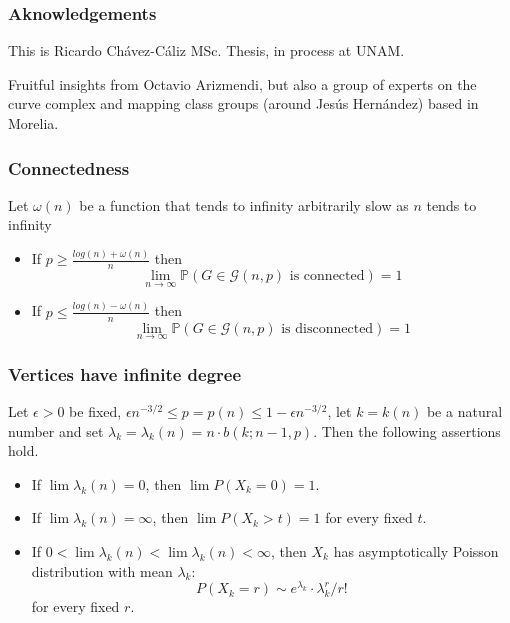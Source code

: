 \documentclass[handout]{beamer}
\theoremstyle{plain}
\renewcommand{\P}{\mathbb{P}}
\newcommand{\G}{\mathcal{G}}
\begin{document}
\begin{frame}\frametitle{Aknowledgements}

\begin{center}
This  is  Ricardo Ch\'avez-C\'aliz  MSc. Thesis, in process at  UNAM. 
\end{center}

Fruitful  insights  from  Octavio Arizmendi, \pause but  also a  group  of  experts on the  curve  complex  and  mapping class  groups (around Jes\'us Hern\'andez) based  in Morelia.

\end{frame}

\begin{frame}
\frametitle{Connectedness}

\begin{theorem}
Let $\omega(n)$ be a function that tends to infinity arbitrarily slow as $n$ tends to infinity
\begin{itemize}
\item If $p\geq \frac{log(n)+ \omega(n)}{n}$ then 
$$\lim_{n \to \infty} \P(G \in \G(n,p) \text{ is connected}) = 1$$
\item If $p\leq \frac{log(n)- \omega(n)}{n}$ then
$$\lim_{n \to \infty} \P(G \in \G(n,p) \text{ is disconnected}) = 1$$
\end{itemize}
\end{theorem}

\end{frame}

\begin{frame}
\frametitle{Vertices have  infinite  degree}
\begin{theorem}
Let $\epsilon>0$ be fixed, $\epsilon n^{-3/2} \leq p = p(n) \leq 1 - \epsilon n^{-3/2}$, let $k = k(n)$ be a natural number and set $\lambda_{k} = \lambda_{k}(n) = n\cdot b(k;n - 1,p)$. Then the following assertions hold.

\begin{itemize}
\item If $\lim \lambda_{k}(n) = 0$, then $\lim P(X_{k} = 0) = 1$. 
\item If $\lim \lambda_{k}(n) = \infty$, then $\lim P(X_{k} > t) = 1$
for every fixed $t$.
\item If $0 < \lim\lambda_{k}(n) < \lim \lambda_{k}(n) < \infty$,
then $X_{k}$ has asymptotically Poisson distribution with mean $\lambda_{k}$: 
$$P(X_{k} = r) \sim e^{\lambda_{k}}\cdot \lambda_{k}^{r}/ r!$$
for every fixed $r$.
\end{itemize}
\end{theorem}
\end{frame}
\end{document}
